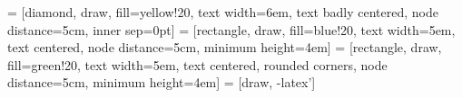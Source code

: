 \usepackage{tikz}
\usetikzlibrary{backgrounds}
\usetikzlibrary{decorations.pathreplacing}
\usetikzlibrary{patterns}
\usetikzlibrary{fadings}
\usetikzlibrary{shapes,arrows}
 = [diamond, draw, fill=yellow!20, 
    text width=6em, text badly centered, node distance=5cm, inner sep=0pt]
 = [rectangle, draw, fill=blue!20, 
    text width=5em, text centered, node distance=5cm, minimum height=4em]
 = [rectangle, draw, fill=green!20, 
    text width=5em, text centered, rounded corners, node distance=5cm, minimum height=4em]
 = [draw, -latex']



\usepackage[newfloat=true,chapter]{minted}
               
